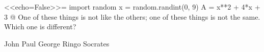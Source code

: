 <<echo=False>>=
import random
x = random.randint(0, 9)
A = x**2 + 4*x + 3
@
One of these things is not like the others; one of these things is not the same. Which one is different?
\begin{choices}
    \choice John
    \choice Paul
    \choice George
    \choice Ringo
    \CorrectChoice Socrates
\end{choices}
